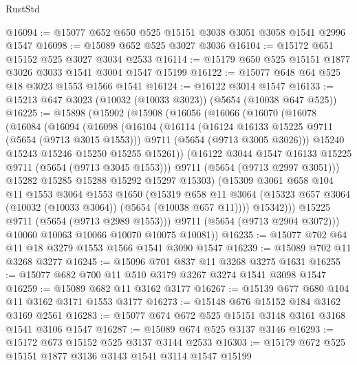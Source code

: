 \begin{lexlean}{RustStd}
\begin{coremodule}
@16094 := @15077 @652 @650 @525 @15151 @3038 @3051 @3058 @1541 @2996 @1547
@16098 := @15089 @652 @525 @3027 @3036
@16104 := @15172 @651 @15152 @525 @3027 @3034 @2533
@16114 := @15179 @650 @525 @15151 @1877 @3026 @3033 @1541 @3004 @1547 @15199
@16122 := @15077 @648 @64 @525 @18 @3023 @1553 @1566 @1541
@16124 := @16122 @3014 @1547
@16133 := @15213 @647 @3023 (@10032 (@10033 @3023)) (@5654 (@10038 @647 @525))
@16225 := @15898
    (@15902
      (@15908
        (@16056
          (@16066
            (@16070
              (@16078
                (@16084
                  (@16094
                    (@16098
                      (@16104
                        (@16114
                          (@16124 @16133 @15225 @9711 (@5654 (@9713 @3015 @1553)))
                          @9711
                          (@5654 (@9713 @3005 @3026)))
                        @15240
                        @15243
                        @15246
                        @15250
                        @15255
                        @15261))
                    (@16122 @3044 @1547 @16133 @15225 @9711 (@5654 (@9713 @3045 @1553)))
                    @9711
                    (@5654 (@9713 @2997 @3051)))
                  @15282
                  @15285
                  @15288
                  @15292
                  @15297
                  @15303)
                (@15309
                  @3061
                  @658
                  @104
                  @11
                  @1553
                  @3064
                  @1553
                  @1650
                  (@15319
                    @658
                    @11
                    @3064
                    (@15323 @657 @3064 (@10032 (@10033 @3064)) (@5654 (@10038 @657 @11))))
                  @15342)))
            @15225
            @9711
            (@5654 (@9713 @2989 @1553)))
          @9711
          (@5654 (@9713 @2904 @3072)))
        @10060
        @10063
        @10066
        @10070
        @10075
        @10081))
@16235 := @15077 @702 @64 @11 @18 @3279 @1553 @1566 @1541 @3090 @1547
@16239 := @15089 @702 @11 @3268 @3277
@16245 := @15096 @701 @837 @11 @3268 @3275 @1631
@16255 := @15077 @682 @700 @11 @510 @3179 @3267 @3274 @1541 @3098 @1547
@16259 := @15089 @682 @11 @3162 @3177
@16267 := @15139 @677 @680 @104 @11 @3162 @3171 @1553 @3177
@16273 := @15148 @676 @15152 @184 @3162 @3169 @2561
@16283 := @15077 @674 @672 @525 @15151 @3148 @3161 @3168 @1541 @3106 @1547
@16287 := @15089 @674 @525 @3137 @3146
@16293 := @15172 @673 @15152 @525 @3137 @3144 @2533
@16303 := @15179 @672 @525 @15151 @1877 @3136 @3143 @1541 @3114 @1547 @15199

\end{coremodule}
\end{lexlean}
